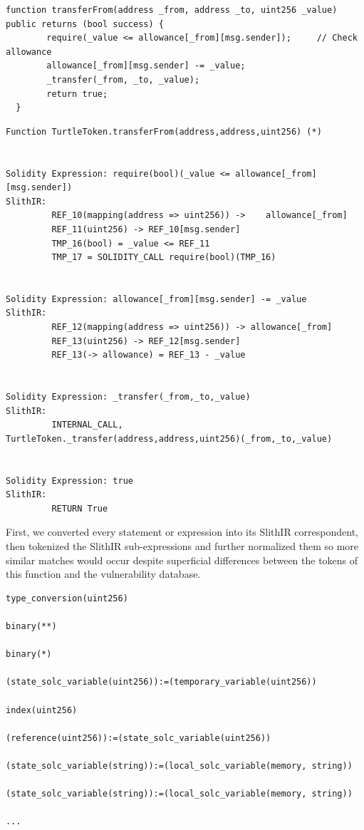 \begin{lstlisting}[float,caption= complete Solidity function from the contract TurtleToken.sol., escapechar=\%, language=Solidity, label=lst:solidity-bug]
  function transferFrom(address _from, address _to, uint256 _value) public returns (bool success) {
        require(_value <= allowance[_from][msg.sender]);     // Check allowance
        allowance[_from][msg.sender] -= _value;
        _transfer(_from, _to, _value);
        return true;
  }
  \end{lstlisting}

  \begin{lstlisting}[float,caption= The same function with its SlithIR expressions printed out., escapechar=\%, language=Solidity, label=lst:solidity-bug]
Function TurtleToken.transferFrom(address,address,uint256) (*)
 
 
Solidity Expression: require(bool)(_value <= allowance[_from][msg.sender])
SlithIR: 
         REF_10(mapping(address => uint256)) ->    allowance[_from]
         REF_11(uint256) -> REF_10[msg.sender]
         TMP_16(bool) = _value <= REF_11
         TMP_17 = SOLIDITY_CALL require(bool)(TMP_16)
 
 
Solidity Expression: allowance[_from][msg.sender] -= _value
SlithIR: 
         REF_12(mapping(address => uint256)) -> allowance[_from]
         REF_13(uint256) -> REF_12[msg.sender]
         REF_13(-> allowance) = REF_13 - _value
 
 
Solidity Expression: _transfer(_from,_to,_value)
SlithIR: 
         INTERNAL_CALL,      TurtleToken._transfer(address,address,uint256)(_from,_to,_value)
 
 
Solidity Expression: true
SlithIR: 
         RETURN True
    \end{lstlisting}


First, we converted every statement or expression into its SlithIR correspondent, then tokenized the SlithIR sub-expressions and further normalized them so more similar matches would occur despite superficial differences between the tokens of this function and the vulnerability database.

\begin{lstlisting}[float,caption= Normalized SlithIR tokens of the previous expressions., escapechar=\%, language=Solidity, label=lst:solidity-bug]
type_conversion(uint256)
 
binary(**)
 
binary(*)
 
(state_solc_variable(uint256)):=(temporary_variable(uint256))
 
index(uint256)
 
(reference(uint256)):=(state_solc_variable(uint256))
 
(state_solc_variable(string)):=(local_solc_variable(memory, string))
 
(state_solc_variable(string)):=(local_solc_variable(memory, string))
 
...
  \end{lstlisting}


